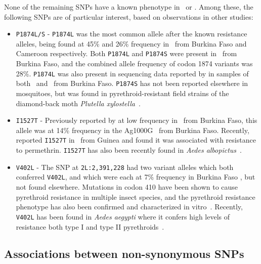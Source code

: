 \begin{refsection}
None of the remaining SNPs have a known phenotype in \agam\ or \acol.
%
Among these, the following SNPs are of particular interest, based on observations in other studies:
%
\begin{itemize}
    \item \texttt{P1874L/S} - \texttt{P1874L} was the most common allele after the known resistance alleles, being found at 45\% and 26\% frequency in \agam\ from Burkina Faso and Cameroon respectively.
    Both \texttt{P1874L} and \texttt{P1874S} were present in \acol\ from Burkina Faso, and the combined allele frequency of codon 1874 variants was 28\%.
    \texttt{P1874L} was also present in sequencing data reported by \textcite{Jones2012} in samples of both \agam\ and \acol\ from Burkina Faso.
    \texttt{P1874S} has not been reported elsewhere in mosquitoes, but was found in pyrethroid-resistant field strains of the diamond-back moth \textit{Plutella xylostella}~\parencite{Sonoda2010}.
    \item \texttt{I1527T} - Previously reported by \textcite{Jones2012} at low frequency in \acol\ from Burkina Faso, this allele was at 14\% frequency in the Ag1000G \acol\ from Burkina Faso.
    Recently, \textcite{Collins2019} reported \texttt{I1527T} in \agam\ from Guinea and found it was associated with resistance to permethrin.
    \texttt{I1527T} has also been recently found in \textit{Aedes albopictus}~\parencite{Auteri2018}.
    \item \texttt{V402L} - The SNP at \texttt{2L:2,391,228} had two variant alleles which both conferred \texttt{V402L}, and which were each at 7\% frequency in Burkina Faso \acol, but not found elsewhere.
    Mutations in codon 410 have been shown to cause pyrethroid resistance in multiple insect species, and the pyrethroid resistance phenotype has also been confirmed and characterized in vitro~\parencite{Dong2014}.
    Recently, \texttt{V402L} has been found in \textit{Aedes aegypti} where it confers high levels of resistance both type I and type II pyrethroids~\parencite{Haddi2017,VillanuevaSegura2020}.
\end{itemize}
%


\subsection{Associations between non-synonymous SNPs}\label{subsec:results-ld}



\end{refsection}
